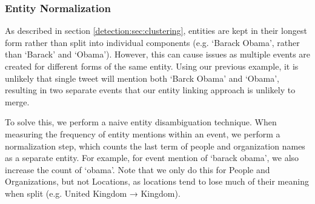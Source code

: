 \subsubsection{Entity Normalization}
\label{sec:entityNorm}
As described in section \ref{detection:sec:clustering}, entities are kept in their longest form rather than split into individual components (e.g. `Barack Obama', rather than `Barack' and `Obama'). However, this can cause issues as multiple events are created for different forms of the same entity. Using our previous example, it is unlikely that single tweet will mention both `Barck Obama' and `Obama', resulting in two separate events that our entity linking approach is unlikely to merge.

To solve this, we perform a naive entity disambiguation technique. When measuring the frequency of entity mentions within an event, we perform a normalization step, which counts the last term of people and organization names as a separate entity. For example, for event mention of `barack obama', we also increase the count of `obama'. Note that we only do this for People and Organizations, but not Locations, as locations tend to lose much of their meaning when split (e.g. United Kingdom → Kingdom).